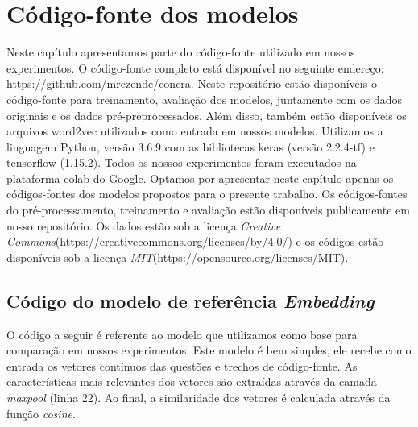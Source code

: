 \chapter{Código-fonte dos modelos}
\label{ape:codigo-fonte-dos-modelos}

Neste capítulo apresentamos parte do código-fonte utilizado em nossos experimentos. O código-fonte completo está disponível no seguinte endereço: \url{https://github.com/mrezende/concra}. Neste repositório estão disponíveis o código-fonte para treinamento, avaliação dos modelos, juntamente com os dados originais e os dados pré-preprocessados. Além disso, também estão disponíveis os arquivos word2vec utilizados como entrada em nossos modelos. Utilizamos a linguagem Python, versão 3.6.9 com as bibliotecas \Gls{keras} (versão 2.2.4-tf) e \Gls{tensorflow} (1.15.2). Todos os nossos experimentos foram executados na plataforma \Gls{colab} do Google. Optamos por apresentar neste capítulo apenas os códigos-fontes dos modelos propostos para o presente trabalho. Os códigos-fontes do pré-processamento, treinamento e avaliação estão disponíveis publicamente em nosso repositório. Os dados estão sob a licença \textit{Creative Commons}(\url{https://creativecommons.org/licenses/by/4.0/}) e os códigos estão disponíveis sob a licença \textit{MIT}(\url{https://opensource.org/licenses/MIT}).

\section{Código do modelo de referência \textit{Embedding}}
\label{sec:codigo-modelo-embedding}

O código a seguir é referente ao modelo que utilizamos como base para comparação em nossos experimentos. Este modelo é bem simples, ele recebe como entrada os vetores contínuos das questões e trechos de código-fonte. As características mais relevantes dos vetores são extraídas através da camada \textit{maxpool} (linha 22). Ao final, a similaridade dos vetores é calculada através da função \textit{cosine}. 


